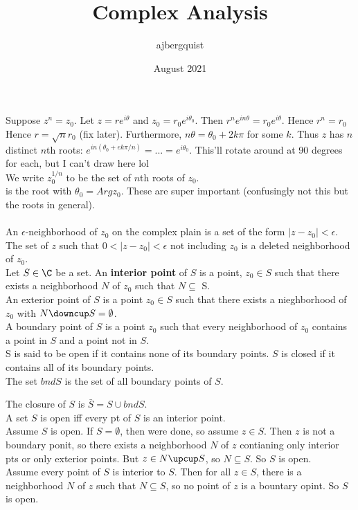 \documentclass{article}
\title{Complex Analysis}
\author{ajbergquist }
\date{August 2021}
\begin{document}
 Suppose $z^n = z_0$. Let $ z = re^{i\theta}$ and $z_0 = r_0 e^{i\theta_0}$. Then $r^ne^{in\theta} = r_0e^{i\theta}.$ Hence $r^n = r_0$ Hence $r = \sqrt{n}{r_0}$ (fix later). Furthermore, $n\theta = \theta_0 + 2k\pi $ for some $k$. Thus $z$ has $n$ distinct $n$th roots: $e^{in(\theta_0+ek\pi/n)} = ...= e^{i\theta_0}$. This'll rotate around at 90 degrees for each, but I can't draw here lol\\

 We write $z_0^{1/n}$ to be the set of $n$th roots of $z_0$.\\

 is the root with $\theta_0= Arg z_0$. These are super important (confusingly not this but the roots in general).\\

\\

 An $\epsilon$-neighborhood of $z_0$ on the complex plain is a set of the form $|z-z_0|<\epsilon$.\\

 The set of $z$ such that $0<|z-z_0|<\epsilon$ not including $z_0$ is a deleted neighborhood of $z_0$. \\

 Let $S\in \C$ be a set. An \textbf{interior point} of $S$ is a point, $z_0\in S$ such that there exists a neighborhood $N$ of $z_0$ such that $N\subseteq$ S.\\

 An exterior point of $S$ is a point $z_0\in S$ such that there exists a nieghborhood of $z_0$ with $N\downcup S = \emptyset$. \\

 A boundary point of $S$ is a point $z_0$ such that every neighborhood of $z_0$ contains a point in $S$ and a point not in $S$. \\

 S is said to be open if it contains none of its boundary points. $S$ is closed if it contains all of its boundary points. \\

 The set $bndS$ is the set of all boundary points of $S$.

 The closure of $S$ is $\bar{S} = S\cup bnd S$.\\

 A set $S$ is open iff every pt of $S$ is an interior point.\\
 Assume $S$ is open. If $S = \emptyset$, then were done, so assume $z\in S$. Then $z$ is not a boundary ponit, so there exists a neighborhood $N$ of $z$ contianing only interior pts or only exterior points. But $z\in N\upcup S$, so $N\subseteq S$.  So $S$ is open.\\
Assume every point of $S$ is interior to $S$. Then for all $z\in S$, there is a neighborhood $N$ of $z$ such that $N\subseteq S$, so no point of $z$ is a bountary opint. So $S$ is open.\\
\end{document}
